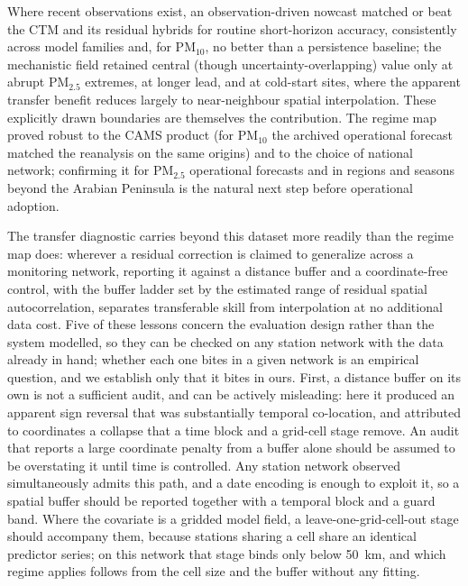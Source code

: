 \documentclass[review,times,authoryear]{elsarticle}
\newcommand*{\pmtf}{\ensuremath{\mathrm{PM_{2.5}}}}
\newcommand*{\pmten}{\ensuremath{\mathrm{PM_{10}}}}
\begin{document}
Where recent observations exist, an observation-driven nowcast matched or beat the CTM and its residual hybrids for routine short-horizon accuracy, consistently across model families and, for \pmten{}, no better than a persistence baseline; the mechanistic field retained central (though uncertainty-overlapping) value only at abrupt \pmtf{} extremes, at longer lead, and at cold-start sites, where the apparent transfer benefit reduces largely to near-neighbour spatial interpolation. These explicitly drawn boundaries are themselves the contribution. The regime map proved robust to the CAMS product (for \pmten{} the archived operational forecast matched the reanalysis on the same origins) and to the choice of national network; confirming it for \pmtf{} operational forecasts and in regions and seasons beyond the Arabian Peninsula is the natural next step before operational adoption. 

The transfer diagnostic carries beyond this dataset more readily than the regime map does: wherever a residual correction is claimed to generalize across a monitoring network, reporting it against a distance buffer and a coordinate-free control, with the buffer ladder set by the estimated range of residual spatial autocorrelation, separates transferable skill from interpolation at no additional data cost. Five of these lessons concern the evaluation design rather than the system modelled, so they can be checked on any station network with the data already in hand; whether each one bites in a given network is an empirical question, and we establish only that it bites in ours. First, a distance buffer on its own is not a sufficient audit, and can be actively misleading: here it produced an apparent sign reversal that was substantially temporal co-location, and attributed to coordinates a collapse that a time block and a grid-cell stage remove. An audit that reports a large coordinate penalty from a buffer alone should be assumed to be overstating it until time is controlled. Any station network observed simultaneously admits this path, and a date encoding is enough to exploit it, so a spatial buffer should be reported together with a temporal block and a guard band. Where the covariate is a gridded model field, a leave-one-grid-cell-out stage should accompany them, because stations sharing a cell share an identical predictor series; on this network that stage binds only below 50~km, and which regime applies follows from the cell size and the buffer without any fitting. 
\end{document}
